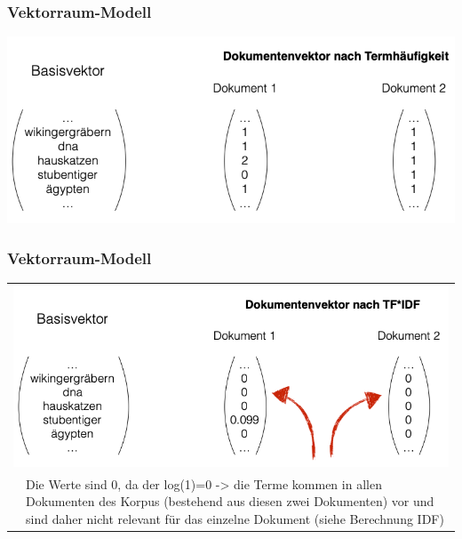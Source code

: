     
\begin{frame}
    \frametitle{Vektorraum-Modell}
    \vspace{1.5cm}
    \includegraphics[width=\linewidth]{fig8/tfvektor}
    
\end{frame}


    
\begin{frame}
    \frametitle{Vektorraum-Modell}
    \vspace{.5cm}
    
    \begin{table}[htp]
    \begin{center}
    \begin{tabular}{p{3cm}p{7cm}}
    \multicolumn{2}{c}{\includegraphics[width=\linewidth]{fig8/tfidfvektor}}\\
     & \tiny{Die Werte sind 0, da der log(1)=0 -> die Terme kommen in allen Dokumenten des Korpus (bestehend aus diesen zwei Dokumenten) vor und sind daher nicht relevant für das einzelne Dokument (siehe Berechnung IDF)}\\
    \end{tabular}
    \end{center}
    \end{table}
    
\end{frame}
    
